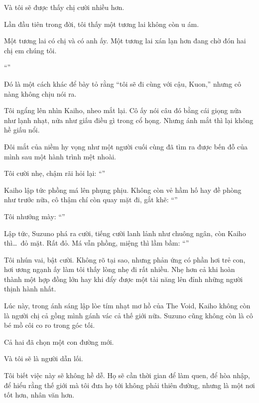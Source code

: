 \documentclass[../main.tex]{subfiles}
\begin{document}
Và tôi sẽ được thấy chị cười nhiều hơn.

Lần đầu tiên trong đời, tôi thấy một tương lai không còn u ám.

Một tương lai có chị và có anh ấy. Một tương lai xán lạn hơn đang chờ đón hai chị em chúng tôi.

\ct


``''

Đó là một cách khác để bày tỏ rằng ``tôi sẽ đi cùng với cậu, Kuon,'' nhưng cô nàng không chịu nói ra.

Tôi ngẩng lên nhìn Kaiho, nheo mắt lại. Cô ấy nói câu đó bằng cái giọng nửa như lạnh nhạt, nửa như giấu điều gì trong cổ họng. Nhưng ánh mắt thì lại không hề giấu nổi.

Đôi mắt của niềm hy vọng như một người cuối cùng đã tìm ra được bến đỗ của mình sau một hành trình mệt nhoài.

Tôi cười nhẹ, chậm rãi hỏi lại: ``''

Kaiho lập tức phồng má lên phụng phịu. Không còn vẻ hầm hố hay đề phòng như trước nữa, cô thậm chí còn quay mặt đi, gắt khẽ: ``''

Tôi nhướng mày: ``''

Lập tức, Suzuno phá ra cười, tiếng cười lanh lảnh như chuông ngân, còn Kaiho thì\dots\ đỏ mặt. Rất đỏ. Má vẫn phồng, miệng thì lầm bầm: ``''

Tôi nhún vai, bật cười. Không rõ tại sao, nhưng phản ứng có phần hơi trẻ con, hơi ương ngạnh ấy làm tôi thấy lòng nhẹ đi rất nhiều. Nhẹ hơn cả khi hoàn thành một hợp đồng lớn hay khi đẩy được một tài năng lên đỉnh những người thịnh hành nhất.

Lúc này, trong ánh sáng lập lòe tím nhạt mơ hồ của The Void, Kaiho không còn là người chị cả gồng mình gánh vác cả thế giới nữa. Suzuno cũng không còn là cô bé mồ côi co ro trong góc tối.

Cả hai đã chọn một con đường mới.

Và tôi sẽ là người dẫn lối.

Tôi biết việc này sẽ không hề dễ. Họ sẽ cần thời gian để làm quen, để hòa nhập, để hiểu rằng thế giới mà tôi đưa họ tới không phải thiên đường, nhưng là một nơi tốt hơn, nhân văn hơn.
\end{document}

